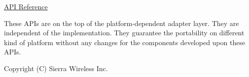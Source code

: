\hyperlink{pa__lpt_8h}{A\+PI Reference}





These A\+P\+Is are on the top of the platform-\/dependent adapter layer. They are independent of the implementation. They guarantee the portability on different kind of platform without any changes for the components developed upon these A\+P\+Is.





Copyright (C) Sierra Wireless Inc. 
